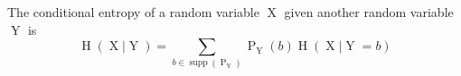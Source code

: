 The conditional entropy of a random variable $\operatorname{X}$ given another random variable $\operatorname{Y}$ is
$$\operatorname{H}(\operatorname{X} | \operatorname{Y}) = \sum\limits_{b \in \operatorname{supp}(\operatorname{P}_{\operatorname{Y}})} \operatorname{P}_{\operatorname{Y}}(b) \operatorname{H}(\operatorname{X} | \operatorname{Y} = b)$$
